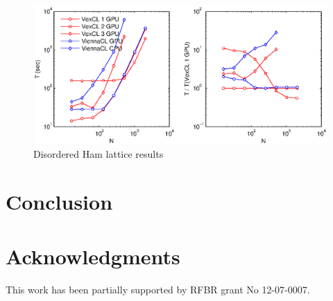 \documentclass[1p]{elsarticle}
\begin{document}
\begin{figure}
    \begin{center}
	\includegraphics[width=\textwidth]{data/disordered_lattice/disordered_lattice}
    \end{center}
    \caption{Disordered Ham lattice results}
    \label{fig:phase:perf}
\end{figure}

\section{Conclusion}

\section{Acknowledgments}

This work has been partially supported by RFBR grant No 12-07-0007.

\nocite{*}


\end{document}
